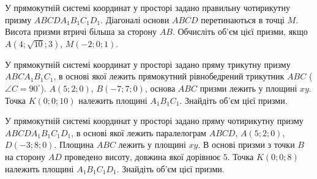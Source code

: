 \documentclass[12pt]{article}
\begin{document}
\begin{samepage}
\par{}
\end{samepage}

\begin{samepage}
\par{}
\end{samepage}


\begin{samepage}
\noindent\zadnum У прямокутній системі координат у просторі задано правильну чотирикутну призму $ABCDA_1B_1C_1D_1$. Діагоналі основи $ABCD$ перетинаються в точці $M$. Висота призми втричі більша за сторону $AB$. Обчисліть об'єм цієї призми, якщо $A(4; \sqrt{10}; 3)$, $M(-2; 0; 1)$. 

\nmtnobreak
\nopagebreak\nbvspace{0.3cm}
\nmtAnswerBox
\par{}
\end{samepage}

\begin{samepage}
\noindent\zadnum У прямокутній системі координат у просторі задано пряму трикутну призму $ABCA_1B_1C_1$, в основі якої лежить прямокутний рівнобедрений трикутник $ABC$ ($\angle C = 90^\circ$). $A(5; 2; 0)$, $B(-7; 7; 0)$, основа $ABC$ призми лежить у площині $xy$. Точка $K(0; 0; 10)$ належить площині $A_1B_1C_1$. Знайдіть об'єм цієї призми. 
\nmtAnswerBox
\par{}
\end{samepage}

\begin{samepage}
\noindent\zadnum У прямокутній системі координат у просторі задано пряму чотирикутну призму $ABCDA_1B_1C_1D_1$, в основі якої лежить паралелограм $ABCD$, $A(5; 2; 0)$, $D(-3; 8; 0)$. Площина $ABC$ лежить у площині $xy$. В основі призми з точки $B$ на сторону $AD$ проведено висоту, довжина якої дорівнює $5$. Точка $K(0; 0; 8)$ належить площині $A_1B_1C_1D_1$. Знайдіть об'єм цієї призми. 
\nmtAnswerBox
\par{}
\end{samepage}
\end{document}
